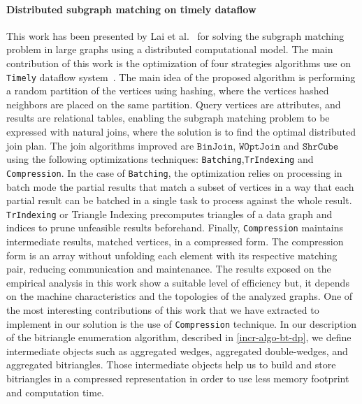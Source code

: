 \paragraph{Distributed subgraph matching on timely dataflow} This work has been presented by Lai et al.~\cite{Lai} for solving the subgraph matching problem in large graphs using a distributed computational model.
The main contribution of this work is the optimization of four strategies algorithms use on \texttt{Timely} dataflow system~\cite{timelyflow}. 
The main idea of the proposed algorithm is performing a random partition of the vertices using hashing, where the vertices hashed neighbors are placed on the same partition.
Query vertices are attributes, and results are relational tables, enabling the subgraph matching problem to be expressed with natural joins, where the solution is to find the optimal distributed join plan.
The join algorithms improved are $\mathtt{BinJoin}$, $\mathtt{WOptJoin}$ and $\mathtt{ShrCube}$ using the following optimizations techniques: \texttt{Batching},\texttt{TrIndexing} and \texttt{Compression}.
In the case of \texttt{Batching}, the optimization relies on processing in batch mode the partial results that match a subset of vertices in a way that each partial result can be batched in a single task to process against the whole result.
\texttt{TrIndexing} or Triangle Indexing precomputes triangles of a data graph and indices to prune unfeasible results beforehand. 
Finally, \texttt{Compression} maintains intermediate results, matched vertices, in a compressed form. The compression form is an array without unfolding each element with its respective matching pair, reducing communication and maintenance.
The results exposed on the empirical analysis in this work show a suitable level of efficiency but, it depends on the machine characteristics and the topologies of the analyzed graphs. 
One of the most interesting contributions of this work that we have extracted to implement in our solution is the use of \texttt{Compression} technique. 
In our description of the bitriangle enumeration algorithm, described in \autoref{incr-algo-bt-dp}, we define intermediate objects such as aggregated wedges, aggregated double-wedges, and aggregated bitriangles. 
Those intermediate objects help us to build and store bitriangles in a compressed representation in order to use less memory footprint and computation time.

